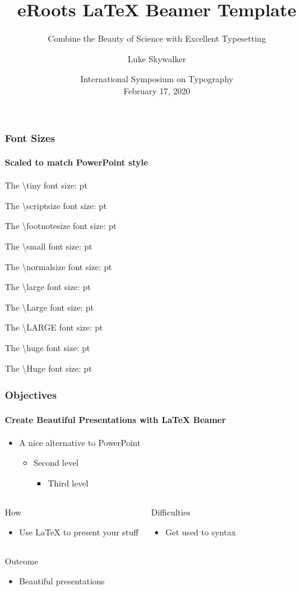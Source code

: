 \documentclass[aspectratio=169,9pt]{beamer}
\author{Luke Skywalker}
\title{eRoots {\LaTeX} Beamer Template}
\subtitle{Combine the Beauty of Science with Excellent Typesetting}
\date[Feb 20]{International Symposium on Typography\\ February 17, 2020}
\makeatletter
\newcommand{\thefontsize}[2]
  {{#1 The \textbackslash #2 font size: \f@size pt\par}}
\makeatother
\begin{document}
\begingroup
{}%
\begin{frame}
  \titlepage
\end{frame}
\endgroup


\begin{frame}
  \frametitle{Font Sizes}
  \framesubtitle{Scaled to match PowerPoint style}
  \thefontsize{\tiny}{tiny}
  \thefontsize{\scriptsize}{scriptsize}
  \thefontsize{\footnotesize}{footnotesize}
  \thefontsize{\small}{small}
  \thefontsize{\normalsize}{normalsize}
  \thefontsize{\large}{large}
  \thefontsize{\Large}{Large}
  \thefontsize{\LARGE}{LARGE}
  \thefontsize{\huge}{huge}
  \thefontsize{\Huge}{Huge}
\end{frame}
\begin{frame}
  \frametitle{Objectives}%
  \framesubtitle{Create Beautiful Presentations with {\LaTeX} Beamer}%
  \begin{itemize}
    \item A nice alternative to PowerPoint
    \begin{itemize}
      \item Second level
      \begin{itemize}
        \item Third level
      \end{itemize}
    \end{itemize}
  \end{itemize}
  \begin{columns}[onlytextwidth]
      \begin{exampleblock}{How}%
        \begin{itemize}
          \item Use {\LaTeX} to present your stuff
        \end{itemize}
      \end{exampleblock}%
      \begin{alertblock}{Difficulties}
        \begin{itemize}
          \item Get used to syntax
        \end{itemize}
      \end{alertblock}%
  \end{columns}
  \begin{block}{Outcome}
    \begin{itemize}
      \item Beautiful presentations
    \end{itemize}
  \end{block}%
\end{frame}
\end{document}
